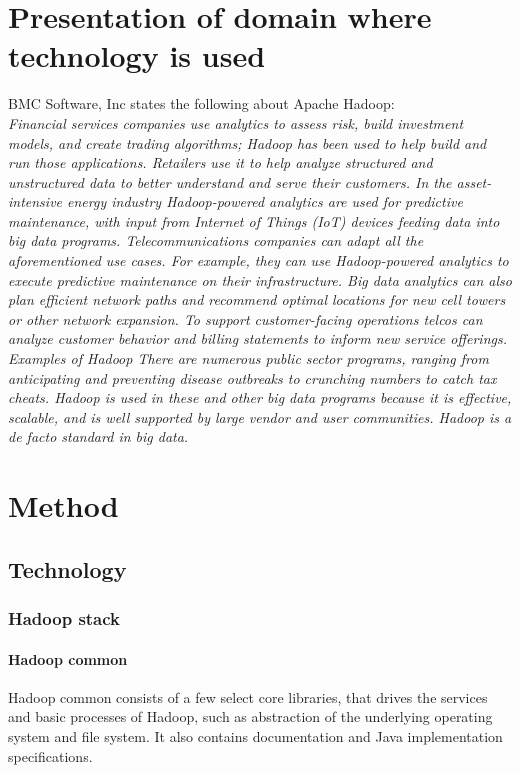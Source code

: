 \documentclass[a4paper,english]{report}
\begin{document}
	\chapter{Presentation of domain where technology is used}
		BMC Software, Inc states the following about Apache Hadoop:\\
		\emph{Financial services companies use analytics to assess risk, build investment models, and create trading algorithms; Hadoop has been used to help build and run those applications.
		Retailers use it to help analyze structured and unstructured data to better understand and serve their customers.
		In the asset-intensive energy industry Hadoop-powered analytics are used for predictive maintenance, with input from Internet of Things (IoT) devices feeding data into big data programs.
		Telecommunications companies can adapt all the aforementioned use cases. For example, they can use Hadoop-powered analytics to execute predictive maintenance on their infrastructure. Big data analytics can also plan efficient network paths and recommend optimal locations for new cell towers or other network expansion. To support customer-facing operations telcos can analyze customer behavior and billing statements to inform new service offerings. Examples of Hadoop
		There are numerous public sector programs, ranging from anticipating and preventing disease outbreaks to crunching numbers to catch tax cheats.
		Hadoop is used in these and other big data programs because it is effective, scalable, and is well supported by large vendor and user communities. Hadoop is a de facto standard in big data.}\cite{bmc}
		

	
	
	\chapter{Method}
		
		\section{Technology}
		\label{technology}
			
			\subsection{Hadoop stack}
				
				\subsubsection{Hadoop common}
					Hadoop common consists of a few select core libraries, that drives the services and basic processes of Hadoop, such as abstraction of the underlying operating system and file system. It also contains documentation and Java implementation specifications. 
				
\end{document}
